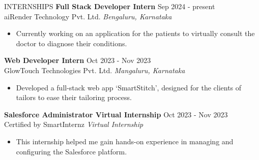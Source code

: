 \documentclass{resume} %
\begin{document}
\begin{rSection}{INTERNSHIPS}
    \textbf{Full Stack Developer Intern} \hfill Sep 2024 - present\\
    aiRender Technology Pvt. Ltd. \hfill \textit{Bengaluru, Karnataka}
    \begin{itemize}
        \itemsep -3pt {}
        \item Currently working on an application for the patients to virtually consult the doctor to diagnose their conditions.
    \end{itemize}

    \textbf{Web Developer Intern} \hfill Oct 2023 - Nov 2023\\
    GlowTouch Technologies Pvt. Ltd. \hfill \textit{Mangaluru, Karnataka}
    \begin{itemize}
        \itemsep -3pt {}
        \item Developed a full-stack web app `SmartStitch', designed for the clients of tailors to ease their tailoring process.
    \end{itemize}

    \textbf{Salesforce Administrator Virtual Internship} \hfill Oct 2023 - Nov 2023\\
    Certified by SmartInternz \hfill \textit{Virtual Internship}
    \begin{itemize}
        \itemsep -3pt {}
        \item This internship helped me gain hands-on experience in managing and configuring the Salesforce platform.
    \end{itemize}

\end{rSection}
\end{document}
